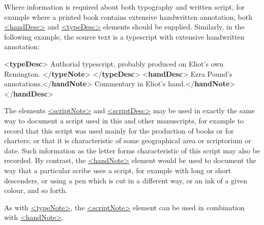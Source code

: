 Where information is required about both typography and written script, for example where a printed book contains extensive handwritten annotation, both \hyperref[TEI.handDesc]{<handDesc>} and \hyperref[TEI.typeDesc]{<typeDesc>} elements should be supplied. Similarly, in the following example, the source text is a typescript with extensive handwritten annotation: \par\bgroup{}\exampleFont \begin{shaded}\noindent\mbox{}{<\textbf{typeDesc}>}\mbox{}\newline 
{}Authorial typescript, probably produced on Eliot's own\mbox{}\newline 
\hspace*{1em}\hspace*{1em} Remington. {</\textbf{typeNote}>}\mbox{}\newline 
{</\textbf{typeDesc}>}\mbox{}\newline 
{<\textbf{handDesc}>}\mbox{}\newline 
{}Ezra Pound's annotations.{</\textbf{handNote}>}\mbox{}\newline 
{}Commentary in Eliot's hand.{</\textbf{handNote}>}\mbox{}\newline 
{</\textbf{handDesc}>}\end{shaded}\egroup\par \par
The elements \hyperref[TEI.scriptNote]{<scriptNote>} and \hyperref[TEI.scriptDesc]{<scriptDesc>} may be used in exactly the same way to document a script used in this and other manuscripts, for example to record that this script was used mainly for the production of books or for charters; or that it is characteristic of some geographical area or scriptorium or date. Such information as the letter forms characteristic of this script may also be recorded. By contrast, the \hyperref[TEI.handNote]{<handNote>} element would be used to document the way that a particular scribe uses a script, for example with long or short descenders, or using a pen which is cut in a different way, or an ink of a given colour, and so forth.\par
As with \hyperref[TEI.typeNote]{<typeNote>}, the \hyperref[TEI.scriptNote]{<scriptNote>} element can be used in combination with \hyperref[TEI.handNote]{<handNote>}.
